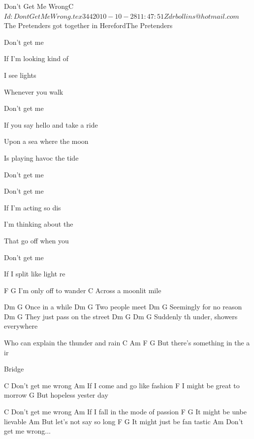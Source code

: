 \begin{SBSong}{Don't Get Me Wrong}{C}
    {$Id: DontGetMeWrong.tex 344 2010-10-28 11:47:51Z drbollins@hotmail.com $}
    {The Pretenders got together in Hereford}{The Pretenders}
  \SBDirection{}
  \begin{SBVerse}
    Don't get me 

    If I'm looking kind of 

    I see  lights
    
    Whenever you walk 
  \end{SBVerse}
  \begin{SBVerse}
    Don't get me 

    If you say hello and  take a ride

    Upon a sea where the  moon
    
    Is playing havoc  the tide
    
    Don't get me    
  \end{SBVerse}
  \begin{SBVerse}
    Don't get me 

    If I'm acting so dis
    
    I'm thinking about the 

    That go off when you 
  \end{SBVerse}
  \begin{SBVerse}
    Don't get me 

    If I split like light re
    
 	F	G
I'm only off to 	wander  	 
 	C
Across a moonlit 	mile
  \end{SBVerse}
  \begin{SBVerse}
 	Dm	G
 	Once in a while 	 
 	Dm	G
 	Two people meet 	 
 	Dm	G
 	Seemingly for no 	reason
 	Dm	G
They just 	pass on the street 	 
 	Dm	G	Dm	G
 	Suddenly th	under, 	showers everywhere 	 

Who can explain the thunder and rain
 	C	Am	F	G
But there's something in the a	ir   	      	     	 

  \end{SBVerse}
  Bridge
  \begin{SBVerse}
 	C
Don't get me 	wrong
 	Am
If I come and go like 	fashion
 	F
I might be great to	morrow
 	G
But hopeless yester	day
  \end{SBVerse}
  \begin{SBVerse}
 	C
Don't get me 	wrong
 	Am
If I fall in the mode of 	passion
 	F	G
It might be unbe	lievable  	 
 	Am
But let's not say so 	long
 	F	G
It might just be fan	tastic 	 
 	Am
Don't get me 	wrong...
  \end{SBVerse}
\end{SBSong}


